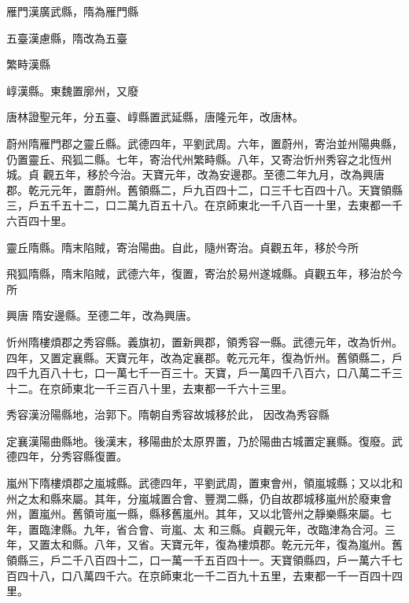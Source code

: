 \begin{pinyinscope}
 雁門漢廣武縣，隋為雁門縣



 五臺漢慮縣，隋改為五臺



 繁畤漢縣



 崞漢縣。東魏置廓州，又廢



 唐林證聖元年，分五臺、崞縣置武延縣，唐隆元年，改唐林。



 蔚州隋雁門郡之靈丘縣。武德四年，平劉武周。六年，置蔚州，寄治並州陽典縣，仍置靈丘、飛狐二縣。七年，寄治代州繁畤縣。八年，又寄治忻州秀容之北恆州城。貞
 觀五年，移於今治。天寶元年，改為安邊郡。至德二年九月，改為興唐郡。乾元元年，置蔚州。舊領縣二，戶九百四十二，口三千七百四十八。天寶領縣三，戶五千五十二，口二萬九百五十八。在京師東北一千八百一十里，去東都一千六百四十里。



 靈丘隋縣。隋末陷賊，寄治陽曲。自此，隨州寄治。貞觀五年，移於今所



 飛狐隋縣，隋末陷賊，武德六年，復置，寄治於易州遂城縣。貞觀五年，移治於今所



 興唐
 隋安邊縣。至德二年，改為興唐。



 忻州隋樓煩郡之秀容縣。義旗初，置新興郡，領秀容一縣。武德元年，改為忻州。四年，又置定襄縣。天寶元年，改為定襄郡。乾元元年，復為忻州。舊領縣二，戶四千九百八十七，口一萬七千一百三十。天寶，戶一萬四千八百六，口八萬二千三十二。在京師東北一千三百八十里，去東都一千六十三里。



 秀容漢汾陽縣地，治郭下。隋朝自秀容故城移於此，
 因改為秀容縣



 定襄漢陽曲縣地。後漢末，移陽曲於太原界置，乃於陽曲古城置定襄縣。復廢。武德四年，分秀容縣復置。



 嵐州下隋樓煩郡之嵐城縣。武德四年，平劉武周，置東會州，領嵐城縣；又以北和州之太和縣來屬。其年，分嵐城置合會、豐潤二縣，仍自故郡城移嵐州於廢東會州，置嵐州。舊領岢嵐一縣，縣移舊嵐州。其年，又以北管州之靜樂縣來屬。七年，置臨津縣。九年，省合會、岢嵐、太
 和三縣。貞觀元年，改臨津為合河。三年，又置太和縣。八年，又省。天寶元年，復為樓煩郡。乾元元年，復為嵐州。舊領縣三，戶二千八百四十二，口一萬一千五百四十一。天寶領縣四，戶一萬六千七百四十八，口八萬四千六。在京師東北一千二百九十五里，去東都一千一百四十四里。




\end{pinyinscope}
